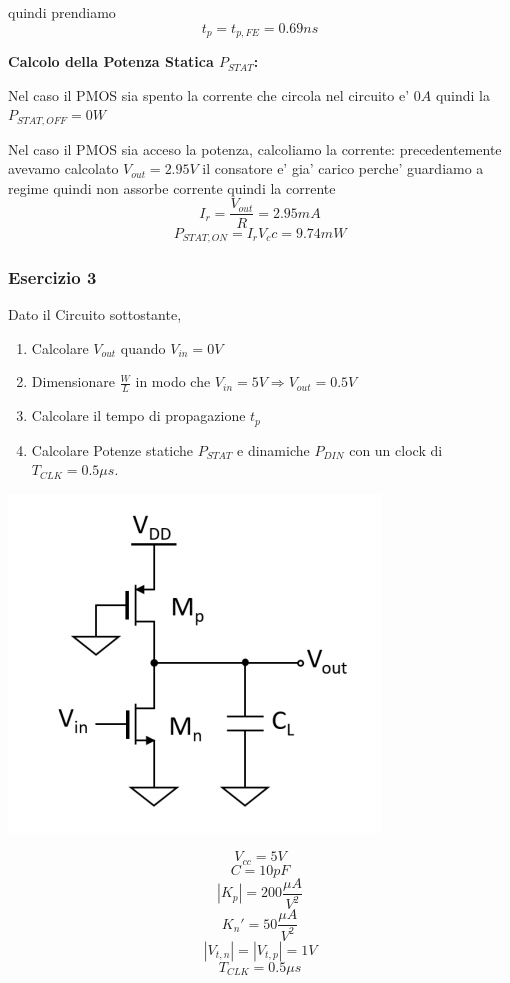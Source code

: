\documentclass[\main/main.tex]{subfiles}
\begin{document}
quindi prendiamo \[t_p = t_{p,FE} = 0.69ns\]

\textbf{Calcolo della Potenza Statica $P_{STAT}$:}

Nel caso il PMOS sia spento la corrente che circola nel circuito e' $0A$ quindi la $P_{STAT,OFF} = 0W$

Nel caso il PMOS sia acceso la potenza, calcoliamo la corrente:
precedentemente avevamo calcolato $V_{out} = 2.95V$
il consatore e' gia' carico perche' guardiamo a regime quindi non assorbe corrente
quindi la corrente
\[I_r = \frac{V_{out}}{R} = 2.95mA\] 
\[P_{STAT,ON} = I_r V_cc = 9.74mW\]


\clearpage
\subsubsection{Esercizio 3}
Dato il Circuito sottostante,
\begin{enumerate}
\item Calcolare $V_{out}$ quando $V_{in} = 0V$
\item Dimensionare $\frac{W}{L}$ in modo che $V_{in} = 5V \Rightarrow V_{out} = 0.5V$
\item Calcolare il tempo di propagazione  $t_p$ 
\item Calcolare Potenze statiche $P_{STAT}$ e dinamiche $P_{DIN}$ con un clock di $T_{CLK} = 0.5\mu s$.
\end{enumerate}

\begin{center}
\includegraphics{esercizio3}
\end{center}
\[V_{cc} = 5V\]
\[C = 10pF\]
\[|K_p| = 200 \frac{\mu A}{V^2}\]
\[K_n' = 50 \frac{\mu A}{V^2}\]
\[|V_{t,n}| = |V_{t,p}| = 1V\]
\[T_{CLK} = 0.5\mu s\]
\end{document}
